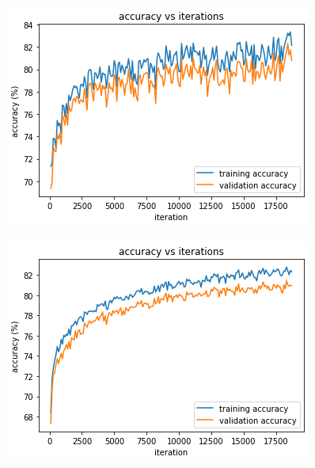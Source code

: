\begin{figure}[H]
    \begin{minipage}{.5\textwidth}
        \centering
        \includegraphics[scale=0.5]{experiments/classification/tanh.png}
        \label{fig:experiments:classification:best-tanh}
    \end{minipage}%
    \hspace{0.25cm}
    \begin{minipage}{.5\textwidth}
        \centering
        \includegraphics[scale=0.5]{experiments/classification/sigmoid.png}
        \label{fig:experiments:classification:best-sigmoid}
    \end{minipage}
\end{figure}
